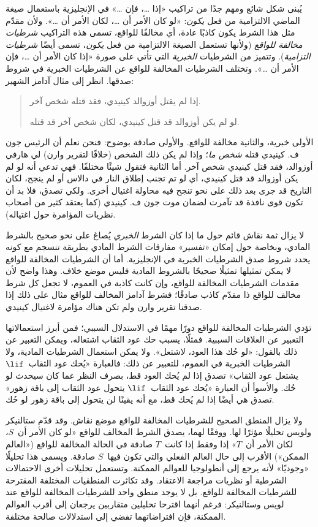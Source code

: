 \documentclass[../../../include/open-logic-section]{subfiles}
\begin{document}


يُبنى شكل شائع ومهم جدًا من تراكيب «إذا \dots، فإن \dots» في الإنجليزية
باستعمال صيغة الماضي الالتزامية من فعل \emph{يكون}: «لو كان الأمر أن
\dots، لكان الأمر أن \dots». ولأن مقدّم مثل هذا الشرط يكون كاذبًا عادة،
أي مخالفًا للواقع، تسمى هذه التراكيب \emph{شرطيات مخالفة للواقع}
(ولأنها تستعمل الصيغة الالتزامية من فعل \emph{يكون}، تسمى أيضًا
\emph{شرطيات التزامية}). وتتميز من الشرطيات \emph{الخبرية} التي تأتي
على صورة «إذا كان الأمر أن \dots، فإن الأمر أن \dots». وتختلف الشرطيات
المخالفة للواقع عن الشرطيات الخبرية في شروط صدقها. انظر إلى مثال آدامز
الشهير:
\begin{quote}
  إذا لم يقتل أوزوالد كينيدي، فقد قتله شخص آخر.
  
  لو لم يكن أوزوالد قد قتل كينيدي، لكان شخص آخر قد قتله.
\end{quote}
الأولى خبرية، والثانية مخالفة للواقع. والأولى صادقة بوضوح: فنحن نعلم أن
الرئيس جون ف. كينيدي قتله \emph{شخص ما}؛ وإذا لم يكن ذلك الشخص
(خلافًا لتقرير وارن) لي هارفي أوزوالد، فقد قتل كينيدي شخص آخر. أما
الثانية فتقول شيئًا مختلفًا. فهي تدعي أنه لو لم يكن أوزوالد قد قتل
كينيدي، أي لو تم تجنب إطلاق النار في دالاس أو لم ينجح، لكان التاريخ قد
جرى بعد ذلك على نحو تنجح فيه محاولة اغتيال أخرى. ولكي تصدق، فلا بد أن
تكون قوى نافذة قد تآمرت لضمان موت جون ف. كينيدي (كما يعتقد كثير من
أصحاب نظريات المؤامرة حول اغتياله).

لا يزال ثمة نقاش قائم حول ما إذا كان الشرط \emph{الخبري} يُصاغ على نحو
صحيح بالشرط المادي، وبخاصة حول إمكان «تفسير» مفارقات الشرط المادي
بطريقة تنسجم مع كونه يحدد شروط صدق الشرطيات الخبرية في الإنجليزية.
أما أن الشرطيات المخالفة للواقع لا يمكن تمثيلها تمثيلًا صحيحًا بالشروط
المادية فليس موضع خلاف. وهذا واضح لأن مقدمات الشرطيات المخالفة للواقع،
وإن كانت كاذبة في العموم، لا تجعل كل شرط مخالف للواقع ذا مقدّم كاذب
صادقًا؛ فشرط آدامز المخالف للواقع مثال على ذلك إذا صدقنا تقرير وارن
ولم تكن هناك مؤامرة لاغتيال كينيدي.

تؤدي الشرطيات المخالفة للواقع دورًا مهمًا في الاستدلال السببي؛ فمن أبرز
استعمالاتها التعبير عن العلاقات السببية. فمثلًا، يسبب حك عود الثقاب
اشتعاله، ويمكن التعبير عن ذلك بالقول: «لو حُك هذا العود، لاشتعل».
ولا يمكن استعمال الشرطيات المادية، ولا الشرطيات الخبرية في العموم،
للتعبير عن ذلك: فالعبارة «يُحك عود الثقاب~$\lif$ يشتعل عود الثقاب»
تصدق إذا لم يُحك العود قط، بصرف النظر عما كان سيحدث لو حُك. والأسوأ أن
العبارة «يُحك عود الثقاب~$\lif$ يتحول عود الثقاب إلى باقة زهور» تصدق
هي أيضًا إذا لم يُحك قط، مع أنه يقينًا لن يتحول إلى باقة زهور لو حُك.

ولا يزال المنطق الصحيح للشرطيات المخالفة للواقع موضع نقاش. وقد قدّم
ستالنيكر ولويس تحليلًا مؤثرًا لها. ووفقًا لهما، يصدق الشرط المخالف
للواقع «لو كان الأمر أن~$S$، لكان الأمر أن~$T$» إذا وفقط إذا كانت~$T$
صادقة في الحالة المخالفة للواقع («العالم الممكن») الأقرب إلى حال العالم
الفعلي والتي تكون فيها~$S$ صادقة. ويسمى هذا تحليلًا «وجوديًا» لأنه
يرجع إلى أنطولوجيا للعوالم الممكنة. وتستعمل تحليلات أخرى الاحتمالات
الشرطية أو نظريات مراجعة الاعتقاد. وقد تكاثرت المنطقيات المختلفة
المقترحة للشرطيات المخالفة للواقع. بل لا يوجد منطق واحد للشرطيات
المخالفة للواقع عند لويس وستالنيكر: فرغم أنهما اقترحا تحليلين متقاربين
يرجعان إلى أقرب العوالم الممكنة، فإن افتراضاتهما تفضي إلى استدلالات
صالحة مختلفة.
\end{document}
